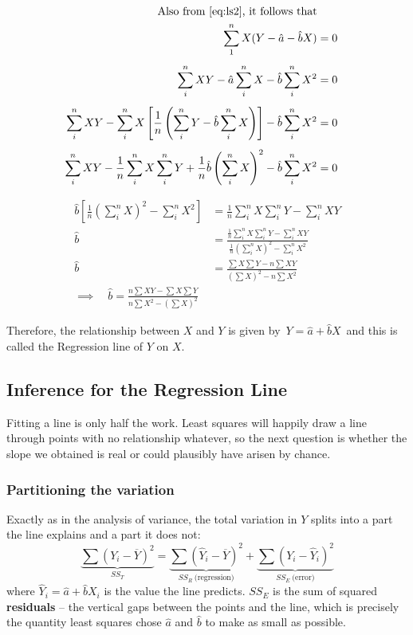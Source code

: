 \documentclass[11pt,a4paper]{article}
\theoremstyle{definition}
\begin{document}
\begin{align*}
\text{Also from } \eqref{eq:ls2} \text{, it follows that}\\
\sum^n_1X(Y-\hat{a}-\hat{b}X)&=0\\[1ex] \sum^n_iXY-\hat{a}\sum^n_iX-\hat{b}\sum^n_iX^2&=0\\[1ex] \sum^n_iXY-\sum^n_iX\left[\frac{1}{n}\left(\sum^n_iY-\hat{b}\sum^n_iX\right)\right]-\hat{b}\sum^n_iX^2&=0\\[1ex] \sum^n_iXY-\frac{1}{n}\sum^n_iX\sum^n_iY+\frac{1}{n}\hat{b}\left(\sum^n_iX\right)^2-\hat{b}\sum^n_iX^2&=0
\end{align*}

\begin{align*}
\hat{b}\left[\frac{1}{n}\left(\sum^n_iX\right)^2-\sum^n_iX^2\right]&=\frac{1}{n}\sum^n_iX\sum^n_iY-\sum^n_iXY\\[1ex] \hat{b}&=\frac{\frac{1}{n}\sum\limits^n_iX\sum\limits^n_iY-\sum\limits^n_iXY}{\frac{1}{n}\left(\sum\limits^n_iX\right)^2-\sum\limits^n_iX^2}\\[1ex] \hat{b}&=\frac{\sum X\sum Y-n\sum XY}{\left(\sum X\right)^2-n\sum X^2}\\[1ex] \implies\quad  \hat{b}=\frac{n\sum XY-\sum X\sum Y}{n\sum X^2-\left(\sum X\right)^2}
\end{align*}

Therefore, the relationship between $X$ and $Y$ is given by \,$Y=\hat{a}+\hat{b}X\,$ and this is called the Regression line of $Y$ on $X$.

\subsection{Inference for the Regression Line}

Fitting a line is only half the work. Least squares will happily draw a line through points
with no relationship whatever, so the next question is whether the slope we obtained is
real or could plausibly have arisen by chance.

\subsubsection{Partitioning the variation}

Exactly as in the analysis of variance, the total variation in $Y$ splits into a part the
line explains and a part it does not:
\[\underbrace{\sum(Y_i-\overline{Y})^2}_{SS_T}
=\underbrace{\sum(\hat{Y}_i-\overline{Y})^2}_{SS_R\ \text{(regression)}}
+\underbrace{\sum(Y_i-\hat{Y}_i)^2}_{SS_E\ \text{(error)}}\]
where $\hat{Y}_i=\hat{a}+\hat{b}X_i$ is the value the line predicts. $SS_E$ is
the sum of squared \textbf{residuals} -- the vertical gaps between the points and the line,
which is precisely the quantity least squares chose $\hat{a}$ and $\hat{b}$ to make
as small as possible.
\end{document}
